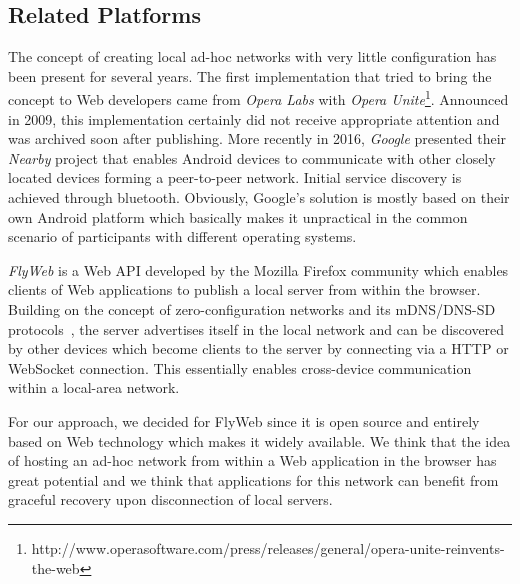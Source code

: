 \subsection{Related Platforms}
\label{sec:related_platforms}

The concept of creating local ad-hoc networks with very little configuration has been present for several years.
The first implementation that tried to bring the concept to Web developers came from \textit{Opera Labs} with \textit{Opera Unite}\footnote{http://www.operasoftware.com/press/releases/general/opera-unite-reinvents-the-web}.
Announced in 2009, this implementation certainly did not receive appropriate attention and was archived soon after publishing.
More recently in 2016, \textit{Google} presented their \textit{Nearby} project that enables Android devices to communicate with other closely located devices forming a peer-to-peer network.
Initial service discovery is achieved through bluetooth.
Obviously, Google's solution is mostly based on their own Android platform which basically makes it unpractical in the common scenario of participants with different operating systems.

\textit{FlyWeb} is a Web API developed by the Mozilla Firefox community which enables clients of Web applications to publish a local server from within the browser.
Building on the concept of zero-configuration networks and its mDNS/DNS-SD protocols~\cite{rfc6762, rfc6763}, the server advertises itself in the local network and can be discovered by other devices which become clients to the server by connecting via a HTTP or WebSocket connection.
This essentially enables cross-device communication within a local-area network.

For our approach, we decided for FlyWeb since it is open source and entirely based on Web technology which makes it widely available.
We think that the idea of hosting an ad-hoc network from within a Web application in the browser has great potential and we think that applications for this network can benefit from graceful recovery upon disconnection of local servers.
